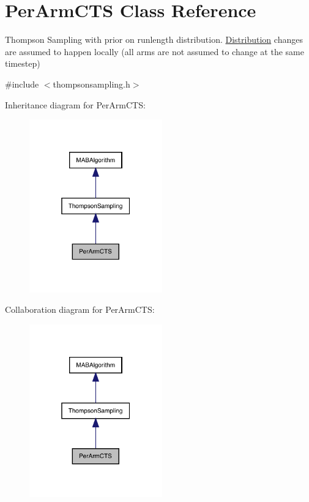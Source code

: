 \hypertarget{class_per_arm_c_t_s}{}\section{Per\+Arm\+C\+TS Class Reference}
\label{class_per_arm_c_t_s}


Thompson Sampling with prior on runlength distribution. \mbox{\hyperlink{class_distribution}{Distribution}} changes are assumed to happen locally (all arms are not assumed to change at the same timestep)  




{\ttfamily \#include $<$thompsonsampling.\+h$>$}



Inheritance diagram for Per\+Arm\+C\+TS\+:
\nopagebreak
\begin{figure}[H]
\begin{center}
\leavevmode
\includegraphics[width=163pt]{class_per_arm_c_t_s__inherit__graph}
\end{center}
\end{figure}


Collaboration diagram for Per\+Arm\+C\+TS\+:
\nopagebreak
\begin{figure}[H]
\begin{center}
\leavevmode
\includegraphics[width=163pt]{class_per_arm_c_t_s__coll__graph}
\end{center}
\end{figure}
